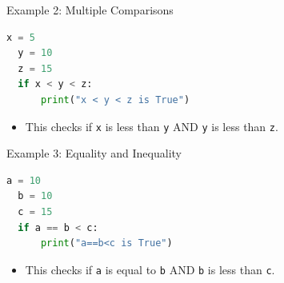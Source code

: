   \begin{frame}[fragile]{Example 2: Multiple Comparisons}
    \begin{lstlisting}[language=Python]
  x = 5
  y = 10
  z = 15
  if x < y < z:
      print("x < y < z is True")
    \end{lstlisting}
    \begin{itemize}
      \item This checks if \texttt{x} is less than \texttt{y} AND \texttt{y} is less than \texttt{z}.
    \end{itemize}
  \end{frame}
  
  \begin{frame}[fragile]{Example 3: Equality and Inequality}
      \begin{lstlisting}[language=Python]
  a = 10
  b = 10
  c = 15
  if a == b < c:
      print("a==b<c is True")
      \end{lstlisting}
      \begin{itemize}
          \item This checks if \texttt{a} is equal to \texttt{b} AND \texttt{b} is less than \texttt{c}.
      \end{itemize}
  \end{frame}

